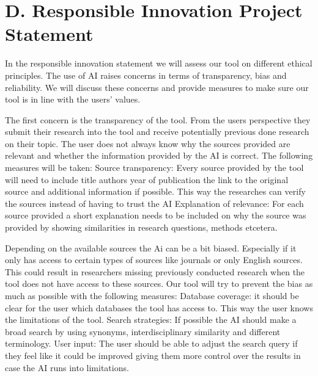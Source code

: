 \documentclass[11pt,a4paper]{article}
\begin{document}
\section*{D. Responsible Innovation Project Statement}
In the responsible innovation statement we will assess our tool on different ethical principles. The use of AI raises concerns in terms of transparency, bias and reliability. We will discuss these concerns and provide measures to make sure our tool is in line with the users’ values. \newline

The first concern is the transparency of the tool. From the users perspective they submit their research into the tool and receive potentially previous done research on their topic. The user does not always know why the sources provided are relevant and whether the information provided by the AI is correct. The following measures will be taken:\newline
Source transparency: Every source provided by the tool will need to include title authors year of publication the link to the original source and additional information if possible. This way the researches can verify the sources instead of having to trust the AI\newline
Explanation of relevance: For each source provided a short explanation needs to be included on why the source was provided by showing similarities in research questions, methods etcetera. \newline

Depending on the available sources the Ai can be a bit biased. Especially if it only has access to certain types of sources like journals or only English sources. This could result in researchers missing previously conducted research when the tool does not have access to these sources. Our tool will try to prevent the bias as much as possible with the following measures: \newline
Database coverage: it should be clear for the user which databases the tool has access to. This way the user knows the limitations of the tool.
Search strategies: If possible the AI should make a broad search by using synonyms, interdisciplinary similarity and different terminology. \newline 
User input: The user should be able to adjust the search query if they feel like it could be improved giving them more control over the results in case the AI runs into limitations. \newline
\end{document}
